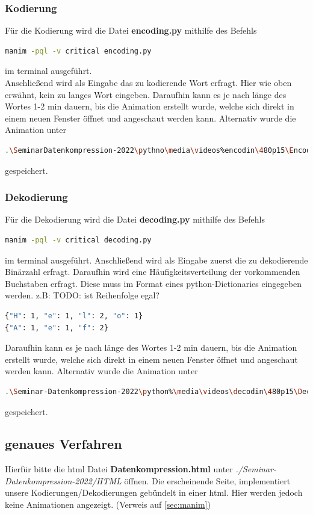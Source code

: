 \documentclass[a4paper]{article}
\theoremstyle{definition}
\theoremstyle{remark}
\begin{document}
\subsubsection{Kodierung}
Für die Kodierung wird die Datei \textbf{encoding.py} mithilfe des Befehls
\begin{lstlisting}[language=bash,
numbers=none]
manim -pql -v critical encoding.py
\end{lstlisting}
im terminal ausgeführt.
\\
Anschließend wird als Eingabe das zu kodierende Wort erfragt. Hier wie oben erwähnt, kein zu langes Wort eingeben.
Daraufhin kann es je nach länge des Wortes 1-2 min dauern, bis die Animation erstellt
wurde, welche sich direkt in einem neuen Fenster öffnet und angeschaut werden kann.
Alternativ wurde die Animation unter
\begin{lstlisting}[language=bash, numbers=none]
.\SeminarDatenkompression-2022\pythno\media\videos%encodin\480p15\Encoding.mp4
\end{lstlisting}
gespeichert.
\subsubsection{Dekodierung}
Für die Dekodierung wird die Datei \textbf{decoding.py} mithilfe des Befehls
\begin{lstlisting}[language=bash,
numbers=none]
manim -pql -v critical decoding.py
\end{lstlisting}
im terminal ausgeführt.
Anschließend wird als Eingabe zuerst die zu dekodierende Binärzahl
erfragt. Daraufhin wird eine Häufigkeitsverteilung der vorkommenden Buchstaben erfragt.
Diese muss im Format eines python-Dictionaries eingegeben werden.
z.B: TODO: ist Reihenfolge egal?
\begin{lstlisting}[language=bash,
numbers=none]
{"H": 1, "e": 1, "l": 2, "o": 1}
{"A": 1, "e": 1, "f": 2}
\end{lstlisting}
Daraufhin kann es je nach länge des Wortes 1-2 min dauern, bis die Animation erstellt
wurde, welche sich direkt in einem neuen Fenster öffnet und angeschaut werden kann.
Alternativ wurde die Animation unter
\begin{lstlisting}[language=bash,
numbers=none]
.\Seminar-Datenkompression-2022\python%\media\videos\decodin\480p15\Decoding.mp4
\end{lstlisting}
gespeichert.

\subsection{genaues Verfahren}
\label{sec:genaues-Verfahren}
Hierfür bitte die html Datei \textbf{Datenkompression.html} unter \textit{./Seminar-Datenkompression-2022/HTML} öffnen. Die erscheinende Seite, implementiert unsere Kodierungen/Dekodierungen gebündelt in einer html. Hier werden jedoch keine Animationen angezeigt. (Verweis auf \ref{sec:manim})
\end{document}
